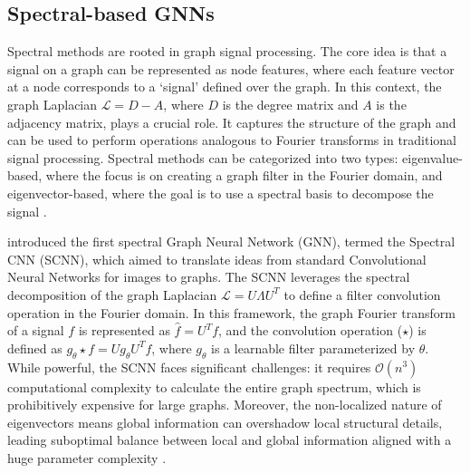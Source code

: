 \subsection{Spectral-based GNNs}

Spectral methods are rooted in graph signal processing. The core idea is that a signal on a graph can be represented as node features, where each feature vector at a node corresponds to a `signal' defined over the graph. In this context, the graph Laplacian $\mathcal{L} = D - A$, where $D$ is the degree matrix and $A$ is the adjacency matrix, plays a crucial role. It captures the structure of the graph and can be used to perform operations analogous to Fourier transforms in traditional signal processing. Spectral methods can be categorized into two types: eigenvalue-based, where the focus is on creating a graph filter in the Fourier domain, and eigenvector-based, where the goal is to use a spectral basis to decompose the signal \cite{bo2023surveyspectralgraphneural}.

 introduced the first spectral Graph Neural Network (GNN), termed the Spectral CNN (SCNN), which aimed to translate ideas from standard Convolutional Neural Networks for images to graphs. The SCNN leverages the spectral decomposition of the graph Laplacian $\mathcal{L} = U \Lambda U^T$ to define a filter convolution operation in the Fourier domain. In this framework, the graph Fourier transform of a signal $f$ is represented as $\hat{f} = U^T f$, and the convolution operation ($\star$) is defined as $g_{\theta} \star f = U g_{\theta} U^T f$, where $g_{\theta}$ is a learnable filter parameterized by $\theta$. While powerful, the SCNN faces significant challenges: it requires $\mathcal{O}(n^3)$ computational complexity to calculate the entire graph spectrum, which is prohibitively expensive for large graphs. Moreover, the non-localized nature of eigenvectors means global information can overshadow local structural details, leading suboptimal balance between local and global information aligned with a huge parameter complexity \cite{usgnn}.

